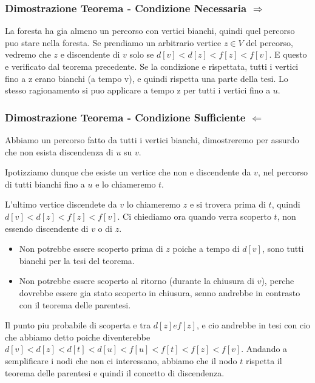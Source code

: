 \subsubsection{Dimostrazione Teorema - Condizione Necessaria $\Rightarrow$}

La foresta ha gia almeno un percorso con vertici bianchi, quindi quel percorso puo stare nella foresta.
Se prendiamo un arbitrario vertice $z \in V$ del percorso, vedremo che $z$ e discendente di $v$ solo se $d[v] < d[z] < f[z] < f[v]$. E questo e verificato dal teorema precedente. Se la condizione e rispettata, tutti i vertici fino a z erano bianchi (a tempo v), e quindi rispetta una parte della tesi. Lo stesso ragionamento si puo applicare a tempo z per tutti i vertici fino a $u$.

\subsubsection{Dimostrazione Teorema - Condizione Sufficiente $\Leftarrow$}

Abbiamo un percorso fatto da tutti i vertici bianchi, dimostreremo per assurdo che non esista discendenza di $u$ su $v$.

Ipotizziamo dunque che esiste un vertice che non e discendente da $v$, nel percorso di tutti  bianchi fino a $u$ e lo chiameremo $t$.

L'ultimo vertice discendete da $v$ lo chiameremo $z$ e si trovera prima di $t$, quindi $d[v] < d[z] < f[z] < f[v]$. Ci chiediamo ora quando verra scoperto $t$, non essendo discendente di $v$ o di $z$. 
\begin{itemize}
	\item Non potrebbe essere scoperto prima di $z$ poiche a tempo di $d[v]$, sono tutti bianchi per la tesi del teorema.
	\item Non potrebbe essere scoperto al ritorno (durante la chiusura di $v$), perche dovrebbe essere gia stato scoperto in chiusura, senno andrebbe in contrasto con il teorema delle parentesi.
\end{itemize} 
Il punto piu probabile di scoperta e tra $d[z] e f[z]$, e cio andrebbe in tesi con cio che abbiamo detto poiche diventerebbe $d[v] < d[z] < d[t] < d[u] < f[u] < f[t] < f[z] < f[v]$. Andando a semplificare i nodi che non ci interessano, abbiamo che il nodo $t$ rispetta il teorema delle parentesi e quindi il concetto di discendenza.

